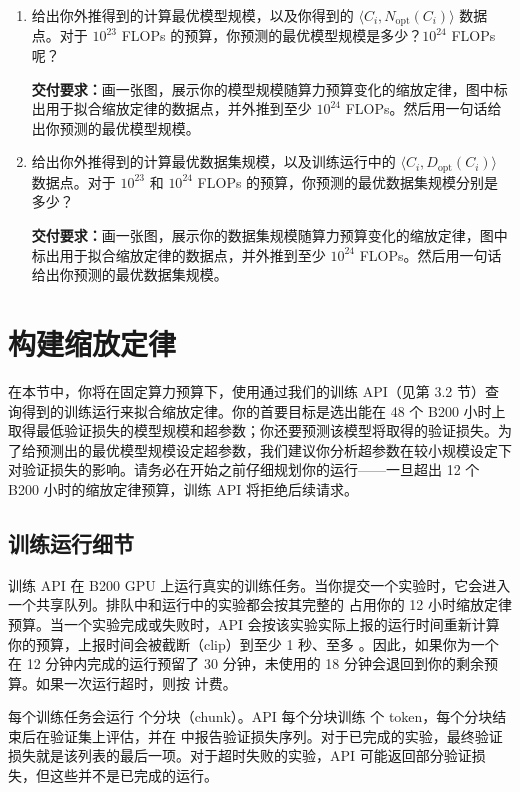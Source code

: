 \begin{enumerate}[label=(\alph*)]
  \item 给出你外推得到的计算最优模型规模，以及你得到的 $\langle C_i, N_{\mathrm{opt}}(C_i) \rangle$ 数据点。对于 $10^{23}$ FLOPs 的预算，你预测的最优模型规模是多少？$10^{24}$ FLOPs 呢？

    \textbf{交付要求：}画一张图，展示你的模型规模随算力预算变化的缩放定律，图中标出用于拟合缩放定律的数据点，并外推到至少 $10^{24}$ FLOPs。然后用一句话给出你预测的最优模型规模。

  \item 给出你外推得到的计算最优数据集规模，以及训练运行中的 $\langle C_i, D_{\mathrm{opt}}(C_i) \rangle$ 数据点。对于 $10^{23}$ 和 $10^{24}$ FLOPs 的预算，你预测的最优数据集规模分别是多少？

    \textbf{交付要求：}画一张图，展示你的数据集规模随算力预算变化的缩放定律，图中标出用于拟合缩放定律的数据点，并外推到至少 $10^{24}$ FLOPs。然后用一句话给出你预测的最优数据集规模。
\end{enumerate}

\section{构建缩放定律}

在本节中，你将在固定算力预算下，使用通过我们的训练 API（见第 3.2 节）查询得到的训练运行来拟合缩放定律。你的首要目标是选出能在 48 个 B200 小时上取得最低验证损失的模型规模和超参数；你还要预测该模型将取得的验证损失。为了给预测出的最优模型规模设定超参数，我们建议你分析超参数在较小规模设定下对验证损失的影响。请务必在开始之前仔细规划你的运行——一旦超出 12 个 B200 小时的缩放定律预算，训练 API 将拒绝后续请求。

\subsection{训练运行细节}

训练 API 在 B200 GPU 上运行真实的训练任务。当你提交一个实验时，它会进入一个共享队列。排队中和运行中的实验都会按其完整的  占用你的 12 小时缩放定律预算。当一个实验完成或失败时，API 会按该实验实际上报的运行时间重新计算你的预算，上报时间会被截断（clip）到至少 1 秒、至多 。因此，如果你为一个在 12 分钟内完成的运行预留了 30 分钟，未使用的 18 分钟会退回到你的剩余预算。如果一次运行超时，则按  计费。

每个训练任务会运行  个分块（chunk）。API 每个分块训练  个 token，每个分块结束后在验证集上评估，并在  中报告验证损失序列。对于已完成的实验，最终验证损失就是该列表的最后一项。对于超时失败的实验，API 可能返回部分验证损失，但这些并不是已完成的运行。

